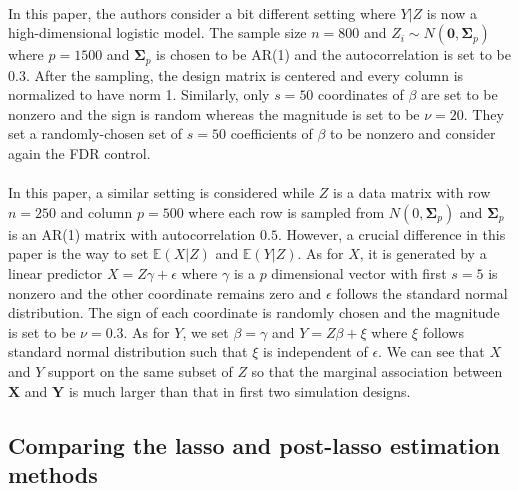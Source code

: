\documentclass[aos]{imsart}
\theoremstyle{plain}
\theoremstyle{remark}
\newcommand{\E}{\mathbb E}								%
\newcommand{\prx}{\bm X}								%
\newcommand{\pry}{{\bm Y}}								%
\begin{document}
\paragraph*{\citet{CetL16}}
In this paper, the authors consider a bit different setting where $Y|Z$ is now a high-dimensional logistic model. The sample size $n=800$ and $Z_i\sim N(\bm{0},\bm{\Sigma}_{p})$ where $p=1500$ and $\bm{\Sigma}_p$ is chosen to be AR(1) and the autocorrelation is set to be $0.3$. After the sampling, the design matrix is centered and every column is normalized to have norm 1. Similarly, only $s=50$ coordinates of $\beta$ are set to be nonzero and the sign is random whereas the magnitude is set to be $\nu=20$. They set a randomly-chosen set of $s=50$ coefficients of $\beta$ to be nonzero and consider again the FDR control.

\paragraph*{\citet{Li2022}}
In this paper, a similar setting is considered while $Z$ is a data matrix with row $n=250$ and column $p=500$ where each row is sampled from $N(0,\bm{\Sigma}_p)$ and $\bm{\Sigma}_p$ is an AR(1) matrix with autocorrelation $0.5$. However, a crucial difference in this paper is the way to set $\E(X|Z)$ and $\E(Y|Z)$. As for $X$, it is generated by a linear predictor $X=Z\gamma+\epsilon$ where $\gamma$ is a $p$ dimensional vector with first $s=5$ is nonzero and the other coordinate remains zero and $\epsilon$ follows the standard normal distribution. The sign of each coordinate is randomly chosen and the magnitude is set to be $\nu=0.3$. As for $Y$, we set $\beta=\gamma$ and $Y=Z\beta+\xi$ where $\xi$ follows standard normal distribution such that $\xi$ is independent of $\epsilon$. We can see that $X$ and $Y$ support on the same subset of $Z$ so that the marginal association between $\prx$ and $\pry$ is much larger than that in first two simulation designs.

\subsection{Comparing the lasso and post-lasso estimation methods} \label{sec:lasso-vs-plasso}
\end{document}
